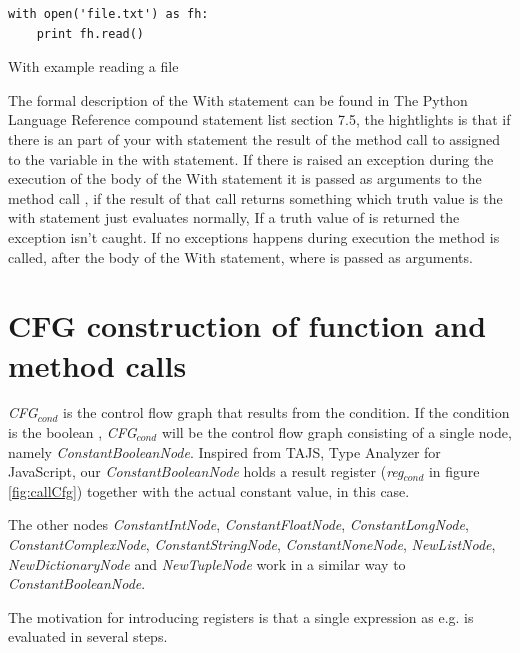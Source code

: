\begin{listing}[H]
	\begin{verbatim}
with open('file.txt') as fh:
	print fh.read()
	\end{verbatim}
	\caption{With example reading a file}\label{code:withExample}
\end{listing}

The formal description of the With statement can be found in The Python Language Reference compound statement list\cite{pyref.compound} section 7.5, 
the hightlights is that if there is an  part of your with statement the result of the method call to  
assigned to the variable in the with statement. If there is raised an exception during the execution of the body of the With statement it is 
passed as arguments to the method call , if the result of that call returns something which truth value is  
the with statement just evaluates normally, If a truth value of  is returned the exception isn't caught. 
If no exceptions happens during execution the  method is called, after the body of the With statement, 
where  is passed as arguments.

\section{CFG construction of function and method calls}
\textit{CFG$_{\textit{cond}}$} is the control flow graph that results from the condition. If the condition is the boolean , 
\textit{CFG$_{\textit{cond}}$} will be the control flow graph consisting of a single node, namely \textit{ConstantBooleanNode}. 
Inspired from TAJS, Type Analyzer for JavaScript, our \textit{ConstantBooleanNode} holds a result register (\textit{reg$_{\textit{cond}}$} in figure \ref{fig:callCfg}) 
together with the actual constant value,  in this case.

The other nodes \textit{ConstantIntNode}, \textit{ConstantFloatNode}, \textit{ConstantLongNode}, \textit{ConstantComplexNode}, \textit{ConstantStringNode}, 
\textit{ConstantNoneNode}, \textit{NewListNode}, \textit{NewDictionaryNode} and \textit{NewTupleNode} work in a similar way to \textit{ConstantBooleanNode}. 

\begin{sloppypar}
  The motivation for introducing registers is that a single expression as e.g.  is evaluated in several steps. 
\end{sloppypar}

